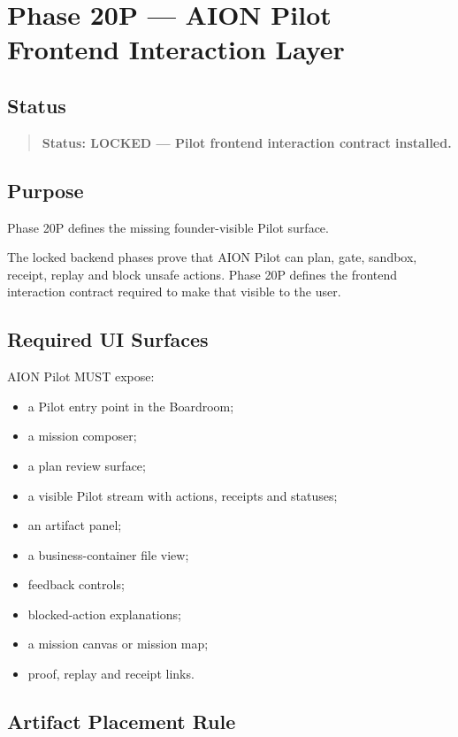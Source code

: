 \section{Phase 20P --- AION Pilot Frontend Interaction Layer}
\label{sec:aion-phase20p-pilot-frontend-interaction}

\subsection{Status}

\begin{quote}
\textbf{Status: LOCKED --- Pilot frontend interaction contract installed.}
\end{quote}

\subsection{Purpose}

Phase 20P defines the missing founder-visible Pilot surface.

The locked backend phases prove that AION Pilot can plan, gate, sandbox, receipt, replay and block unsafe actions. Phase 20P defines the frontend interaction contract required to make that visible to the user.

\subsection{Required UI Surfaces}

AION Pilot MUST expose:

\begin{itemize}
  \item a Pilot entry point in the Boardroom;
  \item a mission composer;
  \item a plan review surface;
  \item a visible Pilot stream with actions, receipts and statuses;
  \item an artifact panel;
  \item a business-container file view;
  \item feedback controls;
  \item blocked-action explanations;
  \item a mission canvas or mission map;
  \item proof, replay and receipt links.
\end{itemize}

\subsection{Artifact Placement Rule}

